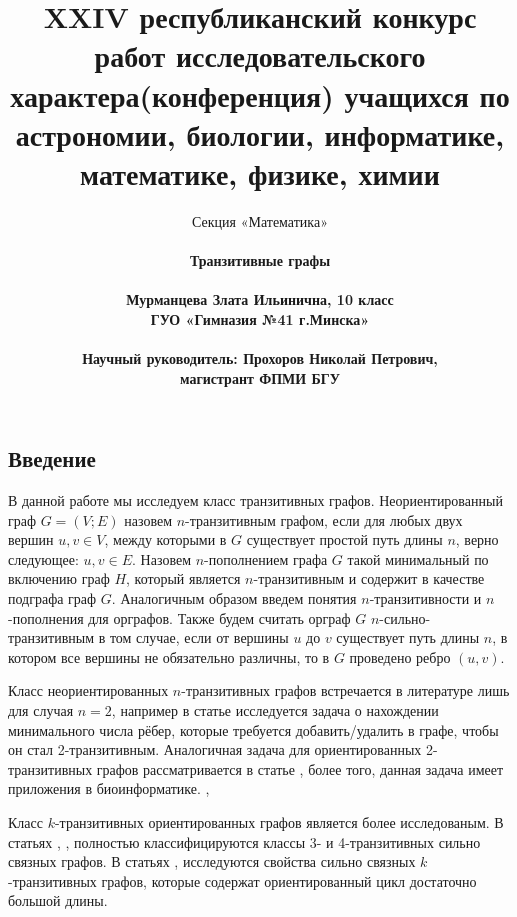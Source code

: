 \documentclass[a4paper,12pt]{article}
\title{ XXIV республиканский конкурс работ исследовательского характера(конференция) учащихся по астрономии, биологии, информатике, математике, физике, химии}
\author{\huge Секция «Математика»
\\
\\
\huge \bf Транзитивные графы
\\
\\
Мурманцева Злата Ильинична, 10 класс 
\\
ГУО «Гимназия №41 г.Минска»\\
	\\
     Научный руководитель: Прохоров Николай Петрович,
     \\
     магистрант ФПМИ БГУ}
\date{ }
\theoremstyle{plain}
\theoremstyle{definition}
\begin{document}
\begin{titlepage}

\maketitle

  
\thispagestyle{empty}


    
    
\end{titlepage}



\newpage
{}
	
	
	
	
	\newpage
	
	
	\tableofcontents
	\setcounter{secnumdepth}{0}
	\setcounter{tocdepth}{2}
	
	
	
	
	\newpage
 \begin{center} \par \section{{Введение}}
	\end{center}
	
	
	В данной работе  мы исследуем класс транзитивных графов. Неориентированный граф $G=(V;E)$ назовем $n$-транзитивным графом, если для любых двух вершин $u, v \in V$, между которыми в $G$ существует простой путь длины $n$, верно следующее: $ {u, v} \in E$. Назовем $n$-пополнением графа $G$ такой минимальный по включению граф $H$, который является $n$-транзитивным и содержит в качестве подграфа граф $G$. Аналогичным образом введем понятия $n$-транзитивности и $n$-пополнения для орграфов. Также будем считать орграф $G$  $n$-сильно-транзитивным в том случае, если от вершины $u$ до $v$ существует путь длины $n$, в котором все вершины не обязательно различны, то в $G$ проведено ребро $(u,v)$.

    Класс неориентированных $n$-транзитивных графов встречается в литературе лишь для случая $n = 2$, например в статье \cite{10} исследуется задача о нахождении минимального числа рёбер, которые требуется добавить/удалить в графе, чтобы он стал 2-транзитивным. Аналогичная задача для ориентированных 2-транзитивных графов рассматривается в статье \cite{4}, более того, данная задача имеет приложения в биоинформатике. \cite{2}, \cite{8}
	
	Класс $k$-транзитивных ориентированных графов является более исследованым. В статьях \cite{3}, \cite{5}, \cite{7} полностью классифицируются классы 3- и 4-транзитивных сильно связных графов. В статьях \cite{6}, \cite{9} исследуются свойства сильно связных $k$-транзитивных графов, которые содержат ориентированный цикл достаточно большой длины.
	
\end{document}
